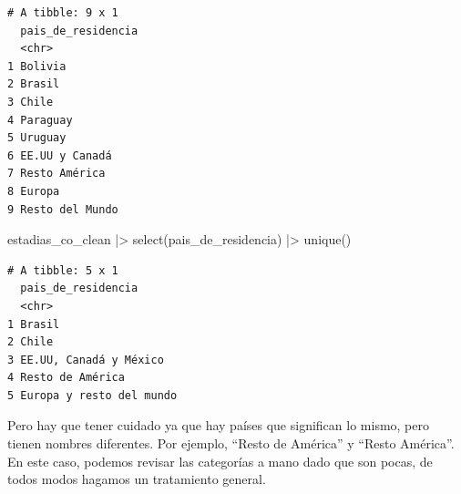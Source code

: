 \documentclass[
  spanish,
  letterpaper,
  DIV=11,
  numbers=noendperiod]{scrartcl}
\newenvironment{Shaded}{\begin{snugshade}}{\end{snugshade}}
\newcommand{\FunctionTok}[1]{\textcolor[rgb]{0.28,0.35,0.67}{#1}}
\newcommand{\NormalTok}[1]{\textcolor[rgb]{0.00,0.23,0.31}{#1}}
\newcommand{\SpecialCharTok}[1]{\textcolor[rgb]{0.37,0.37,0.37}{#1}}
\begin{document}
\begin{verbatim}
# A tibble: 9 x 1
  pais_de_residencia
  <chr>             
1 Bolivia           
2 Brasil            
3 Chile             
4 Paraguay          
5 Uruguay           
6 EE.UU y Canadá    
7 Resto América     
8 Europa            
9 Resto del Mundo   
\end{verbatim}

\begin{Shaded}
\begin{Highlighting}[]
\NormalTok{estadias\_co\_clean }\SpecialCharTok{|\textgreater{}} \FunctionTok{select}\NormalTok{(pais\_de\_residencia) }\SpecialCharTok{|\textgreater{}} \FunctionTok{unique}\NormalTok{()}
\end{Highlighting}
\end{Shaded}

\begin{verbatim}
# A tibble: 5 x 1
  pais_de_residencia      
  <chr>                   
1 Brasil                  
2 Chile                   
3 EE.UU, Canadá y México  
4 Resto de América        
5 Europa y resto del mundo
\end{verbatim}

Pero hay que tener cuidado ya que hay países que significan lo mismo,
pero tienen nombres diferentes. Por ejemplo, ``Resto de América'' y
``Resto América''. En este caso, podemos revisar las categorías a mano
dado que son pocas, de todos modos hagamos un tratamiento general.
\end{document}
